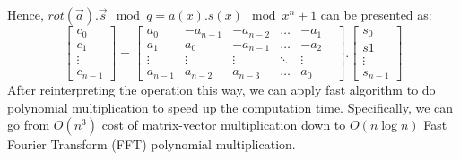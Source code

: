 \begin{description}
\begin{description}
                    Hence,
                    $rot(\vec{a}).\vec{s} \mod q = a(x).s(x) \mod x^n + 1$ can
                    be presented as:
                    \[
                        \begin{bmatrix}
                            c_0\\
                            c_1\\
                            \vdots\\
                            c_{n-1}
                        \end{bmatrix} = \begin{bmatrix}
                            a_0& -a_{n-1}& -a_{n-2}& \dots& -a_1\\
                            a_1& a_0& -a_{n-1}& \dots& -a_2\\
                            \vdots& \vdots& \vdots& \ddots& \vdots&\\
                            a_{n-1}& a_{n-2}& a_{n-3}& \dots& a_0
                        \end{bmatrix}.\begin{bmatrix}
                            s_0 \\ s1\\ \vdots\\ s_{n-1}
                        \end{bmatrix}
                    \]
            After reinterpreting the operation this way, we can apply fast
            algorithm to do polynomial multiplication to speed up the
            computation time. Specifically, we can go from $O(n^3)$ cost of
            matrix-vector multiplication down to $O(n \log n)$ Fast Fourier
            Transform (FFT) polynomial multiplication.


\end{description}
\end{description}
